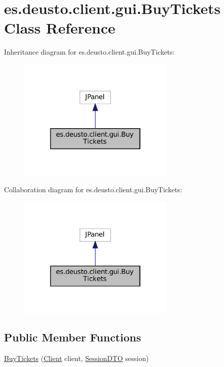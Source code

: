 \hypertarget{classes_1_1deusto_1_1client_1_1gui_1_1_buy_tickets}{}\section{es.\+deusto.\+client.\+gui.\+Buy\+Tickets Class Reference}
\label{classes_1_1deusto_1_1client_1_1gui_1_1_buy_tickets}


Inheritance diagram for es.\+deusto.\+client.\+gui.\+Buy\+Tickets\+:\nopagebreak
\begin{figure}[H]
\begin{center}
\leavevmode
\includegraphics[width=214pt]{classes_1_1deusto_1_1client_1_1gui_1_1_buy_tickets__inherit__graph}
\end{center}
\end{figure}


Collaboration diagram for es.\+deusto.\+client.\+gui.\+Buy\+Tickets\+:\nopagebreak
\begin{figure}[H]
\begin{center}
\leavevmode
\includegraphics[width=214pt]{classes_1_1deusto_1_1client_1_1gui_1_1_buy_tickets__coll__graph}
\end{center}
\end{figure}
\subsection*{Public Member Functions}
\begin{DoxyCompactItemize}
\item 
\mbox{\hyperlink{classes_1_1deusto_1_1client_1_1gui_1_1_buy_tickets_a550c5b4787c8ffd333049cf8d6c32e48}{Buy\+Tickets}} (\mbox{\hyperlink{classes_1_1deusto_1_1client_1_1_client}{Client}} client, \mbox{\hyperlink{classes_1_1deusto_1_1server_1_1data_1_1_session_d_t_o}{Session\+D\+TO}} session)
\end{DoxyCompactItemize}


